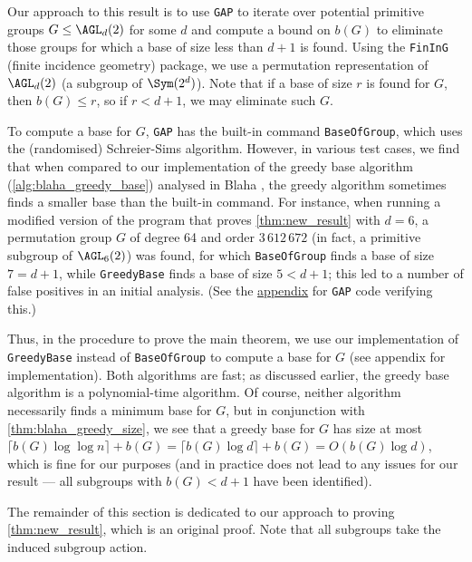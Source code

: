 Our approach to this result is to use \texttt{GAP} to iterate over potential primitive groups $G \leq \AGL_d(2)$ for some $d$ and compute a bound on $b(G)$ to eliminate those groups for which a base of size less than $d + 1$ is found. Using the \texttt{FinInG} (finite incidence geometry) package, we use a permutation representation of $\AGL_d(2)$ (a subgroup of $\Sym(2^d)$). Note that if a base of size $r$ is found for $G$, then $b(G) \leq r$, so if $r < d + 1$, we may eliminate such $G$.

To compute a base for $G$, \texttt{GAP} has the built-in command \texttt{BaseOfGroup}, which uses the (randomised) Schreier-Sims algorithm. However, in various test cases, we find that when compared to our implementation of the greedy base algorithm (\autoref{alg:blaha_greedy_base}) analysed in Blaha \cite{blaha1992}, the greedy algorithm sometimes finds a smaller base than the built-in command. For instance, when running a modified version of the program that proves \autoref{thm:new_result} with $d = 6$, a permutation group $G$ of degree 64 and order $3\,612\,672$ (in fact, a primitive subgroup of $\AGL_6(2)$) was found, for which \texttt{BaseOfGroup} finds a base of size $7 = d + 1$, while \texttt{GreedyBase} finds a base of size $5 < d + 1$; this led to a number of false positives in an initial analysis. (See the \hyperref[app:greedy_better_than_default]{appendix} for \texttt{GAP} code verifying this.)

Thus, in the procedure to prove the main theorem, we use our implementation of \texttt{GreedyBase} instead of \texttt{BaseOfGroup} to compute a base for $G$ (see appendix for implementation). Both algorithms are fast; as discussed earlier, the greedy base algorithm is a polynomial-time algorithm. Of course, neither algorithm necessarily finds a minimum base for $G$, but in conjunction with \autoref{thm:blaha_greedy_size}, we see that a greedy base for $G$ has size at most $\lceil b(G)\log\log n \rceil + b(G) = \lceil b(G)\log d \rceil + b(G) = O(b(G)\log d)$, which is fine for our purposes (and in practice does not lead to any issues for our result --- all subgroups with $b(G) < d + 1$ have been identified).

The remainder of this section is dedicated to our approach to proving \autoref{thm:new_result}, which is an original proof. Note that all subgroups take the induced subgroup action.

